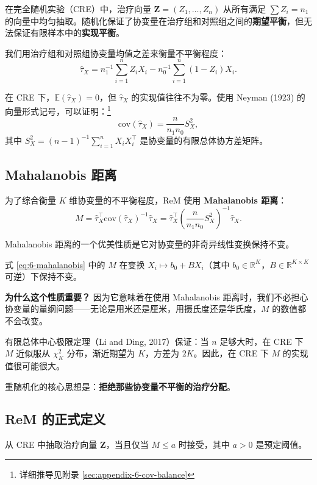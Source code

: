 在完全随机实验（CRE）中，治疗向量 $\mathbf{Z} = (Z_1, \ldots, Z_n)$ 从所有满足 $\sum Z_i = n_1$ 的向量中均匀抽取。随机化保证了协变量在治疗组和对照组之间的\textbf{期望平衡}，但无法保证有限样本中的\textbf{实现平衡}。

我们用治疗组和对照组协变量均值之差来衡量不平衡程度：
\[
\hat{\tau}_X = n_1^{-1}\sum_{i=1}^n Z_i X_i - n_0^{-1}\sum_{i=1}^n (1-Z_i) X_i .
\]

在 CRE 下，$\mathbb{E}(\hat{\tau}_X) = 0$，但 $\hat{\tau}_X$ 的实现值往往不为零。使用 Neyman (1923) 的向量形式记号，可以证明：\footnote{详细推导见附录 \cref{sec:appendix-6-cov-balance}}
\[
\text{cov}(\hat{\tau}_X) = \frac{n}{n_1 n_0} S_X^2 ,
\]
其中 $S_X^2 = (n-1)^{-1}\sum_{i=1}^n X_i X_i^\top$ 是协变量的有限总体协方差矩阵。

\subsection{Mahalanobis 距离}\label{sec:6-mahalanobis}

为了综合衡量 $K$ 维协变量的不平衡程度，ReM 使用 \textbf{Mahalanobis 距离}：
\[
M = \hat{\tau}_X^\top \text{cov}(\hat{\tau}_X)^{-1} \hat{\tau}_X
   = \hat{\tau}_X^\top \left( \frac{n}{n_1 n_0} S_X^2 \right)^{-1} \hat{\tau}_X .
   \label{eq:6-mahalanobis}
\]

Mahalanobis 距离的一个优美性质是它对协变量的非奇异线性变换保持不变。

\begin{Lemma}\label{lemm:6.1}
式 \cref{eq:6-mahalanobis} 中的 $M$ 在变换 $X_i \mapsto b_0 + B X_i$（其中 $b_0 \in \mathbb{R}^K$，$B \in \mathbb{R}^{K \times K}$ 可逆）下保持不变。
\end{Lemma}

\textbf{为什么这个性质重要？} 因为它意味着在使用 Mahalanobis 距离时，我们不必担心协变量的量纲问题——无论是用米还是厘米，用摄氏度还是华氏度，$M$ 的数值都不会改变。

有限总体中心极限定理（Li and Ding, 2017）保证：当 $n$ 足够大时，在 CRE 下 $M$ 近似服从 $\chi_K^2$ 分布，渐近期望为 $K$，方差为 $2K$。因此，在 CRE 下 $M$ 的实现值很可能很大。

重随机化的核心思想是：\textbf{拒绝那些协变量不平衡的治疗分配}。

\subsection{ReM 的正式定义}\label{sec:6-rem-definition}

\begin{Definition}\label{def:6-rem}
从 CRE 中抽取治疗向量 $\mathbf{Z}$，当且仅当 $M \leq a$ 时接受，其中 $a > 0$ 是预定阈值。
\end{Definition}

